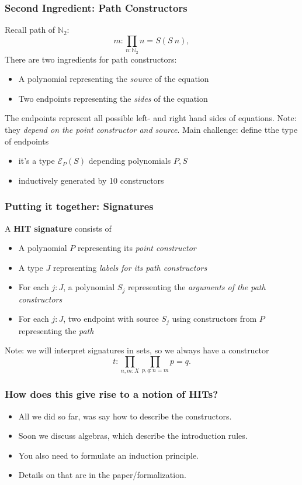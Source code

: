 \documentclass{beamer}
\begin{document}
\begin{frame}
\frametitle{Second Ingredient: Path Constructors}
Recall path of $\mathbb{N}_2$:
\[
m : \prod_{n : \mathbb{N}_2} n = S(S \> n),
\]
\pause
There are two ingredients for path constructors:
\begin{itemize}
	\item A polynomial representing the \emph{source} of the equation
	\item Two endpoints representing the \emph{sides} of the equation 
\end{itemize}
The endpoints represent all possible left- and right hand sides of equations.
Note: they \emph{depend on the point constructor and source}.
\pause
Main challenge: define tthe type of endpoints
\begin{itemize}
	\item it's a type $\mathcal{E}_P(S)$ depending polynomials $P, S$
	\item inductively generated by 10 constructors
\end{itemize}
\end{frame}

\begin{frame}
\frametitle{Putting it together: Signatures}
\begin{definition}
A \textbf{HIT signature} consists of
\begin{itemize}
	\item A polynomial $P$ representing its \emph{point constructor}
	\item A type $J$ representing \emph{labels for its path constructors}
	\item For each $j : J$, a polynomial $S_j$ representing the \emph{arguments of the path constructors}
	\item For each $j : J$, two endpoint with source $S_j$ using constructors from $P$ representing the \emph{path}
\end{itemize}
\end{definition}
Note: we will interpret signatures in sets, so we always have a constructor
\[
t : \prod_{n, m : X} \prod_{p, q : n = m} p = q.
\]
\end{frame}

\begin{frame}
\frametitle{How does this give rise to a notion of HITs?}
\begin{itemize}
	\item All we did so far, was say how to describe the constructors.
	\item Soon we discuss algebras, which describe the introduction rules.
	\item You also need to formulate an induction principle.
	\item Details on that are in the paper/formalization.
\end{itemize}
\end{frame}
\end{document}
